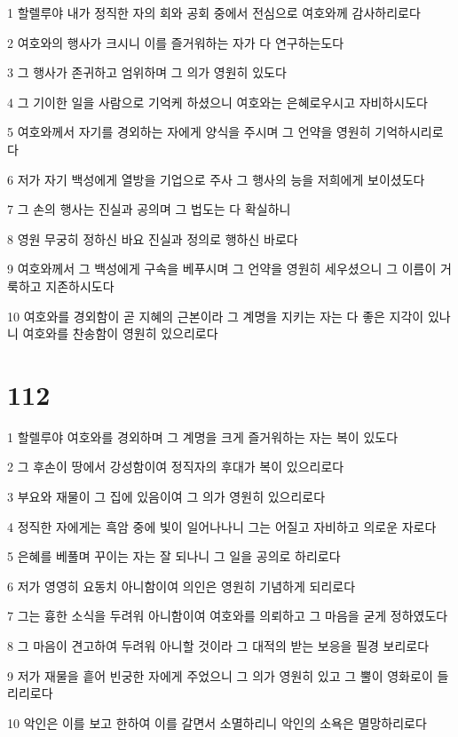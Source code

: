 \par 1 할렐루야 내가 정직한 자의 회와 공회 중에서 전심으로 여호와께 감사하리로다
\par 2 여호와의 행사가 크시니 이를 즐거워하는 자가 다 연구하는도다
\par 3 그 행사가 존귀하고 엄위하며 그 의가 영원히 있도다
\par 4 그 기이한 일을 사람으로 기억케 하셨으니 여호와는 은혜로우시고 자비하시도다
\par 5 여호와께서 자기를 경외하는 자에게 양식을 주시며 그 언약을 영원히 기억하시리로다
\par 6 저가 자기 백성에게 열방을 기업으로 주사 그 행사의 능을 저희에게 보이셨도다
\par 7 그 손의 행사는 진실과 공의며 그 법도는 다 확실하니
\par 8 영원 무궁히 정하신 바요 진실과 정의로 행하신 바로다
\par 9 여호와께서 그 백성에게 구속을 베푸시며 그 언약을 영원히 세우셨으니 그 이름이 거룩하고 지존하시도다
\par 10 여호와를 경외함이 곧 지혜의 근본이라 그 계명을 지키는 자는 다 좋은 지각이 있나니 여호와를 찬송함이 영원히 있으리로다

\chapter{112}

\par 1 할렐루야 여호와를 경외하며 그 계명을 크게 즐거워하는 자는 복이 있도다
\par 2 그 후손이 땅에서 강성함이여 정직자의 후대가 복이 있으리로다
\par 3 부요와 재물이 그 집에 있음이여 그 의가 영원히 있으리로다
\par 4 정직한 자에게는 흑암 중에 빛이 일어나나니 그는 어질고 자비하고 의로운 자로다
\par 5 은혜를 베풀며 꾸이는 자는 잘 되나니 그 일을 공의로 하리로다
\par 6 저가 영영히 요동치 아니함이여 의인은 영원히 기념하게 되리로다
\par 7 그는 흉한 소식을 두려워 아니함이여 여호와를 의뢰하고 그 마음을 굳게 정하였도다
\par 8 그 마음이 견고하여 두려워 아니할 것이라 그 대적의 받는 보응을 필경 보리로다
\par 9 저가 재물을 흩어 빈궁한 자에게 주었으니 그 의가 영원히 있고 그 뿔이 영화로이 들리리로다
\par 10 악인은 이를 보고 한하여 이를 갈면서 소멸하리니 악인의 소욕은 멸망하리로다

